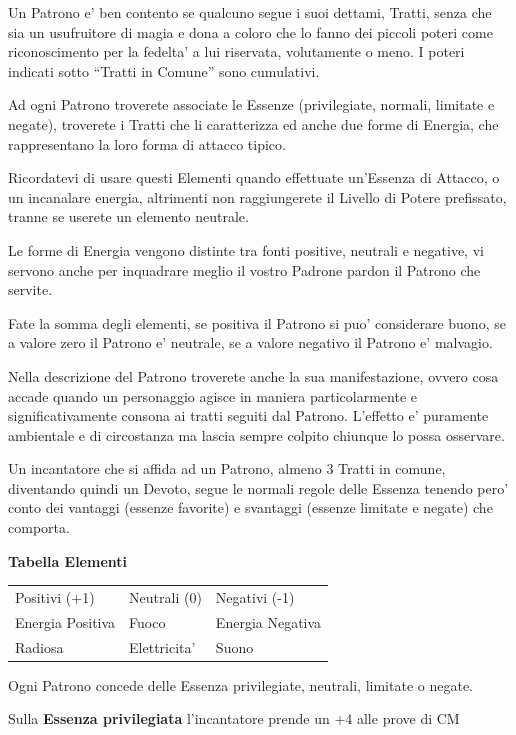 \documentclass[a4paper,11pt,twoside,openany]{dndbook}
\begin{document}
{Un Patrono e' ben contento se qualcuno segue i suoi dettami, Tratti, senza che sia un usufruitore di magia e dona a coloro che lo fanno dei piccoli poteri come riconoscimento per la fedelta' a lui riservata, volutamente o meno. I poteri indicati sotto ``Tratti in Comune'' sono cumulativi.

Ad ogni Patrono troverete associate le Essenze (privilegiate, normali, limitate e negate), troverete i Tratti che li caratterizza ed anche due forme di Energia, che rappresentano la loro forma di attacco tipico. 

Ricordatevi di usare questi Elementi quando effettuate un'Essenza di Attacco, o un incanalare energia, altrimenti non raggiungerete il Livello di Potere prefissato, tranne se userete un elemento neutrale. 

Le forme di Energia vengono distinte tra fonti positive, neutrali e negative, vi servono anche per inquadrare meglio il vostro Padrone pardon il Patrono che servite.

Fate la somma degli elementi, se positiva il Patrono si puo' considerare buono, se a valore zero il Patrono e' neutrale, se a valore negativo il Patrono e' malvagio.

Nella descrizione del Patrono troverete anche la sua manifestazione, ovvero cosa accade quando un personaggio agisce in maniera particolarmente e significativamente consona ai tratti seguiti dal Patrono. L'effetto e' puramente ambientale e di circostanza ma lascia sempre colpito chiunque lo possa osservare.

Un incantatore che si affida ad un Patrono, almeno 3 Tratti in comune, diventando quindi un Devoto, segue le normali regole delle Essenza tenendo pero' conto dei vantaggi (essenze favorite) e svantaggi (essenze limitate e negate) che comporta.

\bigskip

\textbf{Tabella Elementi}

\begin{tabular}[c]{@{}lll@{}}
\toprule 
Positivi (+1) & Neutrali (0) & Negativi (-1)\tabularnewline
Energia Positiva & Fuoco & Energia Negativa\tabularnewline
Radiosa & Elettricita' & Suono\tabularnewline
\bottomrule
\end{tabular}
\bigskip

Ogni Patrono concede delle Essenza privilegiate, neutrali, limitate o negate.

Sulla \textbf{Essenza privilegiata} l'incantatore prende un +4 alle prove di CM

}
\end{document}
